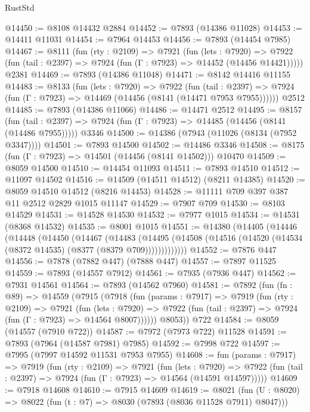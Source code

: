 \begin{lexlean}{RustStd}
\begin{coremodule}
{\begin{coremodule}
{{{{{{{{{{{{{{{{{{{{{{{{{{{{{{{{{{{{{{{{{{{{{{{{{{@14450 := @8108 @14432 @2884
@14452 := @7893 (@14386 @11028)
@14453 := @14411 @11031
@14454 := @7964 @14453
@14456 := @7893 (@14454 @7985)
@14467 := @8111
    (fun (rty : @2109) =>
    @7921
      (fun (lets : @7920) =>
      @7922 (fun (tail : @2397) => @7924 (fun (Γ : @7923) => @14452 (@14456 @14421)))))
    @2381
@14469 := @7893 (@14386 @11048)
@14471 := @8142 @14416 @11155
@14483 := @8133
    (fun (lets : @7920) =>
    @7922
      (fun (tail : @2397) =>
      @7924 (fun (Γ : @7923) => @14469 (@14456 (@8141 (@14471 @7953 @7955))))))
    @2512
@14485 := @7893 (@14386 @11066)
@14486 := @14471 @2512
@14495 := @8157
    (fun (tail : @2397) => @7924 (fun (Γ : @7923) => @14485 (@14456 (@8141 (@14486 @7955)))))
    @3346
@14500 := @14386 (@7943 (@11026 (@8134 (@7952 @3347))))
@14501 := @7893 @14500
@14502 := @14486 @3346
@14508 := @8175 (fun (Γ : @7923) => @14501 (@14456 (@8141 @14502))) @10470
@14509 := @8059 @14500
@14510 := @14454 @11093
@14511 := @7893 @14510
@14512 := @11097 @14502
@14516 := @14509 (@14511 @14512) (@8211 @14385)
@14520 := @8059 @14510 @14512 (@8216 @14453)
@14528 := @11111 @709 @397 @387 @11 @2512 @2829 @1015 @11147
@14529 := @7907 @709
@14530 := @8103 @14529
@14531 := @14528 @14530
@14532 := @7977 @1015
@14534 := @14531 (@8368 @14532)
@14535 := @8001 @1015
@14551 := @14380
    (@14405
      (@14446
        (@14448
          (@14450
            (@14467
              (@14483
                (@14495
                  (@14508 (@14516 (@14520 (@14534 (@8372 @14535) (@8377 (@8379 @709)))))))))))))
@14552 := @7876 @447
@14556 := @7878 (@7882 @447) (@7888 @447)
@14557 := @7897 @11525
@14559 := @7893 (@14557 @7912)
@14561 := @7935 (@7936 @447)
@14562 := @7931 @14561
@14564 := @7893 (@14562 @7960)
@14581 := @7892
    (fun (fn : @89) =>
    @14559
      (@7915
        (@7918
          (fun (params : @7917) =>
          @7919
            (fun (rty : @2109) =>
            @7921
              (fun (lets : @7920) =>
              @7922 (fun (tail : @2397) => @7924 (fun (Γ : @7923) => @14564 @8007))))))
        @8053))
    @722
@14584 := @8059 (@14557 (@7910 @722))
@14587 := @7972 (@7973 @722) @11528
@14591 := @7893 (@7964 (@14587 @7981) @7985)
@14592 := @7998 @722
@14597 := @7995 (@7997 @14592 @11531 @7953 @7955)
@14608 := fun (params : @7917) =>
  @7919
    (fun (rty : @2109) =>
    @7921
      (fun (lets : @7920) =>
      @7922 (fun (tail : @2397) => @7924 (fun (Γ : @7923) => @14564 (@14591 @14597)))))
@14609 := @7918 @14608
@14610 := @7915 @14609
@14619 := @8021
    (fun (U : @8020) => @8022 (fun (t : @7) => @8030 (@7893 (@8036 @11528 @7911) @8047)))
}}}}}}}}}}}}}}}}}}}}}}}}}}}}}}}}}}}}}}}}}}}}}}}}}}
\end{coremodule}}
\end{coremodule}
\end{lexlean}
